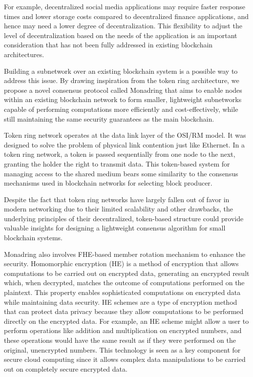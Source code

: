 \documentclass[11pt]{article}
\begin{document}
For example, decentralized social media applications may require faster response times and lower storage costs compared to decentralized finance applications, and hence may need a lower degree of decentralization.
This flexibility to adjust the level of decentralization based on the needs of the application is an important consideration that has not been fully addressed in existing blockchain architectures.

Building a subnetwork over an existing blockchain system is a possible way to address this issue.
By drawing inspiration from the token ring architecture, we propose a novel consensus protocol called Monadring that aims to enable nodes within an existing blockchain network to form smaller, lightweight subnetworks capable of performing computations more efficiently and cost-effectively, while still maintaining the same security guarantees as the main blockchain.

Token ring network operates at the data link layer of the OSI/RM model.
It was designed to solve the problem of physical link contention just like Ethernet.
In a token ring network, a token is passed sequentially from one node to the next, granting the holder the right to transmit data.
This token-based system for managing access to the shared medium bears some similarity to the consensus mechanisms used in blockchain networks for selecting block producer.

Despite the fact that token ring networks have largely fallen out of favor in modern networking due to their limited scalability and other drawbacks, the underlying principles of their decentralized, token-based structure could provide valuable insights for designing a lightweight consensus algorithm for small blockchain systems.

Monadring also involves FHE-based member rotation mechanism to enhance the security.
Homomorphic encryption (HE) is a method of encryption that allows computations to be carried out on encrypted data, generating an encrypted result which, when decrypted, matches the outcome of computations performed on the plaintext.
This property enables sophisticated computations on encrypted data while maintaining data security.
HE schemes are a type of encryption method that can protect data privacy because they allow computations to be performed directly on the encrypted data.
For example, an HE scheme might allow a user to perform operations like addition and multiplication on encrypted numbers, and these operations would have the same result as if they were performed on the original, unencrypted numbers.
This technology is seen as a key component for secure cloud computing since it allows complex data manipulations to be carried out on completely secure encrypted data.
\end{document}

